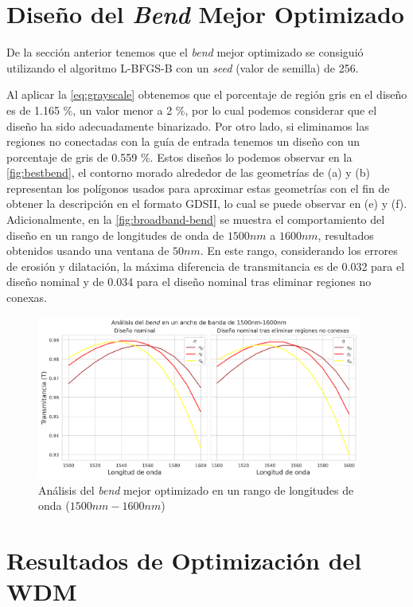 \section{Diseño del \emph{Bend} Mejor Optimizado}\label{sec:best-bend}

De la sección anterior tenemos que el \emph{bend} mejor optimizado se consiguió
utilizando el algoritmo L-BFGS-B con un \emph{seed} (valor de semilla) de 256.

Al aplicar la \autoref{eq:grayscale} obtenemos que el porcentaje de región gris en el diseño
es de 1.165 \%, un valor menor a 2 \%, por lo cual podemos considerar que el diseño ha sido
adecuadamente binarizado. 
Por otro lado, si eliminamos las regiones no conectadas con la guía de entrada
tenemos un diseño con un porcentaje de gris de 0.559 \%.
Estos diseños lo podemos observar en la \autoref{fig:bestbend}, 
el contorno morado alrededor de las geometrías de (a) y (b) representan los polígonos
usados para aproximar estas geometrías con el fin de obtener la descripción en el formato
GDSII, lo cual se puede observar en (e) y (f).
Adicionalmente, en la \autoref{fig:broadband-bend} se muestra el comportamiento del diseño
en un rango de longitudes de onda de $1500nm$ a $1600 nm$, resultados obtenidos usando una ventana de $50nm$.
En este rango, considerando los errores de erosión y dilatación, 
la máxima diferencia de transmitancia es de 0.032 para el diseño nominal
y de 0.034 para el diseño nominal tras eliminar regiones no conexas.

\begin{figure}[H]
  \centering
  \includegraphics[width=0.95\textwidth]{image/results/bend/best/broadband-bend.png}
  \caption{Análisis del \emph{bend} mejor optimizado en un rango de longitudes de onda ($1500 nm-1600 nm$)}
  \label{fig:broadband-bend}
\end{figure}


\section{Resultados de Optimización del WDM}\label{sec:results-wdm}

